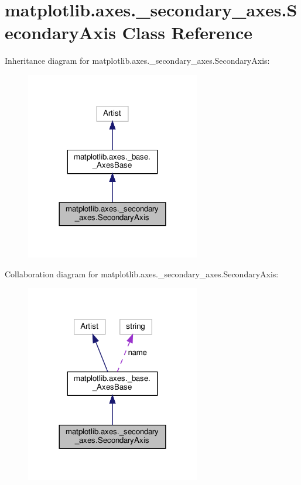 \hypertarget{classmatplotlib_1_1axes_1_1__secondary__axes_1_1SecondaryAxis}{}\section{matplotlib.\+axes.\+\_\+secondary\+\_\+axes.\+Secondary\+Axis Class Reference}
\label{classmatplotlib_1_1axes_1_1__secondary__axes_1_1SecondaryAxis}


Inheritance diagram for matplotlib.\+axes.\+\_\+secondary\+\_\+axes.\+Secondary\+Axis\+:
\nopagebreak
\begin{figure}[H]
\begin{center}
\leavevmode
\includegraphics[width=216pt]{classmatplotlib_1_1axes_1_1__secondary__axes_1_1SecondaryAxis__inherit__graph}
\end{center}
\end{figure}


Collaboration diagram for matplotlib.\+axes.\+\_\+secondary\+\_\+axes.\+Secondary\+Axis\+:
\nopagebreak
\begin{figure}[H]
\begin{center}
\leavevmode
\includegraphics[width=216pt]{classmatplotlib_1_1axes_1_1__secondary__axes_1_1SecondaryAxis__coll__graph}
\end{center}
\end{figure}
